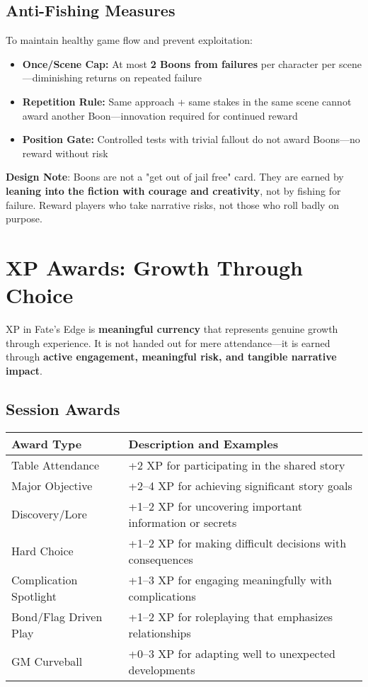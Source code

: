 \subsection*{Anti-Fishing Measures}

To maintain healthy game flow and prevent exploitation:

\begin{itemize}
    \item \textbf{Once/Scene Cap:} At most \textbf{2 Boons from failures} per character per scene—diminishing returns on repeated failure
    \item \textbf{Repetition Rule:} Same approach + same stakes in the same scene cannot award another Boon—innovation required for continued reward
    \item \textbf{Position Gate:} Controlled tests with trivial fallout do not award Boons—no reward without risk
\end{itemize}

\textbf{Design Note}: Boons are not a "get out of jail free" card. They are earned by \textbf{leaning into the fiction with courage and creativity}, not by fishing for failure. Reward players who take narrative risks, not those who roll badly on purpose.

\section*{XP Awards: Growth Through Choice}

XP in Fate's Edge is \textbf{meaningful currency} that represents genuine growth through experience. It is not handed out for mere attendance---it is earned through \textbf{active engagement, meaningful risk, and tangible narrative impact}.

\subsection*{Session Awards}

\begin{fatebox}
\begin{tabularx}{\textwidth}{lX}
\toprule
\textbf{Award Type} & \textbf{Description and Examples} \\
\midrule
Table Attendance & +2 XP for participating in the shared story \\
Major Objective & +2--4 XP for achieving significant story goals \\
Discovery/Lore & +1--2 XP for uncovering important information or secrets \\
Hard Choice & +1--2 XP for making difficult decisions with consequences \\
Complication Spotlight & +1--3 XP for engaging meaningfully with complications \\
Bond/Flag Driven Play & +1--2 XP for roleplaying that emphasizes relationships \\
GM Curveball & +0--3 XP for adapting well to unexpected developments \\
\bottomrule
\end{tabularx}
\end{fatebox}


